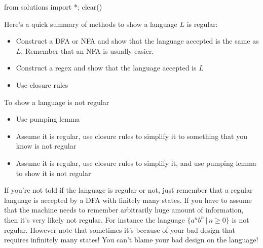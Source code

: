\begin{python0}
  from solutions import *; clear()
\end{python0}

Here's a quick summary of methods to show a language $L$ is
regular:
\begin{itemize}
 \item Construct a DFA or NFA and show that the language accepted
 is the same as $L$. Remember that an NFA is usually easier.
 \item Construct a regex and show that the language accepted is
 $L$
 \item Use closure rules
\end{itemize}

To show a language is not regular
\begin{itemize}
 \item Use pumping lemma
 \item Assume it is regular, use closure rules to simplify it to
 something that you know is not regular
 \item Assume it is regular, use closure rules to simplify it, and
 use pumping lemma to show it is not regular
\end{itemize}

If you're not told if the language is regular or not, just
remember that a regular language is accepted by a DFA with
finitely many states. If you have to assume that the machine needs
to remember arbitrarily huge amount of information, then it's very
likely not regular. For instance the language $\{a^nb^n \,|\, n
\geq 0\}$ is not regular. However note that sometimes it's because
of your bad design that requires infinitely many states! You can't
blame your bad design on the language!
